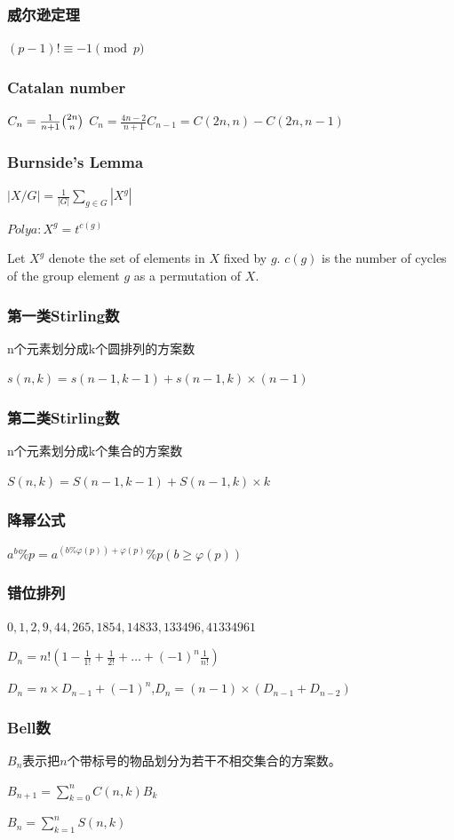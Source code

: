 \documentclass[UTF8,a4paper,titlepage]{ctexart}
\begin{document}
\subsubsection*{威尔逊定理}
$(p-1)!\equiv -1\pmod{p}$
\subsubsection*{Catalan number}
$C_n=\frac{1}{n+1}\tbinom{2n}{n}$\qquad
$C_n=\frac{4n-2}{n+1}C_{n-1}=C(2n,n)-C(2n,n-1)$

\subsubsection*{Burnside’s Lemma}
$\left|X/G\right|=\frac{1}{\left|G\right|}\sum_{g \in G}\left|X^g\right|$

$Polya: X^g=t^{c(g)}$

Let $X^g$ denote the set of elements in $X$ fixed by $g$.
$c(g)$ is the number of cycles of the group element $g$ as a permutation of $X$.

\subsubsection*{第一类Stirling数}
n个元素划分成k个圆排列的方案数

$s(n,k)=s(n-1,k-1)+s(n-1,k)\times(n-1)$

\subsubsection*{第二类Stirling数}
n个元素划分成k个集合的方案数

$S(n,k)=S(n-1,k-1)+S(n-1,k) \times k$

\subsubsection*{降幂公式}
$a^b\%p=a^{(b\%\varphi(p))+\varphi(p)}\%p(b\geq\varphi(p))$
\subsubsection*{错位排列}
$0,1,2,9,44,265,1854,14833,133496,41334961$

$D_n=n!(1-\frac{1}{1!}+\frac{1}{2!}+\dots+(-1)^n\frac{1}{n!})$

$D_n=n\times D_{n-1}+(-1)^n$,$D_n=(n-1)\times(D_{n-1}+D_{n-2})$

\subsubsection*{Bell数}
$B_n$表示把$n$个带标号的物品划分为若干不相交集合的方案数。\par
$B_{n+1}=\sum_{k=0}^nC(n,k)B_k$\par
$B_{n}=\sum_{k=1}^nS(n,k)$\par     
\end{document}
